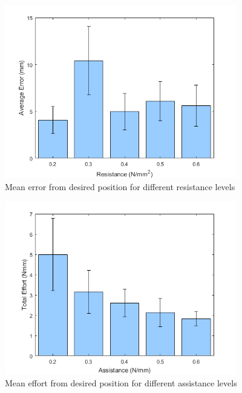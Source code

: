 \documentclass[12pt]{report}
\begin{document}
\begin{figure}[h]
	\centering
	\includegraphics[width=0.9\textwidth]{err_resist}
	\caption{Mean error from desired position for different resistance levels}
	\label{fig:err_resist}
\end{figure}		

\begin{figure}[h]
	\centering
	\includegraphics[width=0.9\textwidth]{eff_assist}
	\caption{Mean effort from desired position for different assistance levels}
	\label{fig:eff_assist}
\end{figure}		
\end{document}

